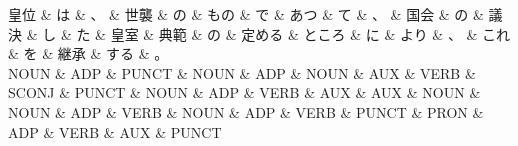\documentclass[tikz,border=5pt]{standalone}
\begin{document}
\normalsize
\begin{dependency}[edge unit distance=12.0pt]
    \begin{deptext}[column sep=1em]
        皇位 \& は \& 、 \& 世襲 \& の \& もの \& で \& あつ \& て \& 、 \& 国会 \& の \& 議決 \& し \& た \& 皇室 \& 典範 \& の \& 定める \& ところ \& に \& より \& 、 \& これ \& を \& 継承 \& する \& 。\\
        NOUN \& ADP \& PUNCT \& NOUN \& ADP \& NOUN \& AUX \& VERB \& SCONJ \& PUNCT \& NOUN \& ADP \& VERB \& AUX \& AUX \& NOUN \& NOUN \& ADP \& VERB \& NOUN \& ADP \& VERB \& PUNCT \& PRON \& ADP \& VERB \& AUX \& PUNCT\\
    \end{deptext}
\end{dependency}
\end{document}

